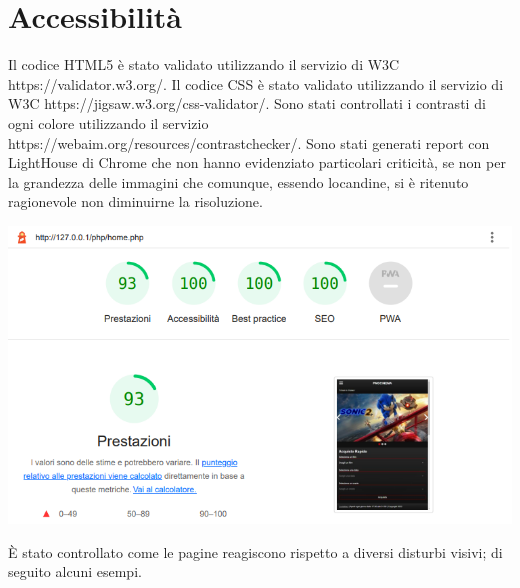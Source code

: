 \documentclass[a4paper, 12pt]{article}
\begin{document}
\section{Accessibilità}
Il codice HTML5 è stato validato utilizzando il servizio di W3C https://validator.w3.org/.
Il codice CSS è stato validato utilizzando il servizio di W3C https://jigsaw.w3.org/css-validator/.
Sono stati controllati i contrasti di ogni colore utilizzando il servizio \\https://webaim.org/resources/contrastchecker/.
Sono stati generati report con LightHouse di Chrome che non hanno evidenziato particolari criticità, se non per la grandezza delle immagini che comunque, essendo locandine, si è ritenuto ragionevole non
diminuirne la risoluzione.
\begin{center}
    \includegraphics[scale=0.4]{home}
\end{center}
È stato controllato come le pagine reagiscono rispetto a diversi disturbi visivi; di seguito alcuni esempi.
\end{document}
